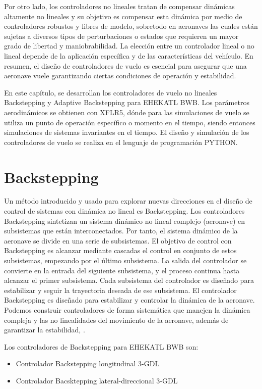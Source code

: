 Por otro lado, los controladores no lineales tratan de compensar dinámicas altamente no lineales y su objetivo es compensar esta dinámica por medio de controladores robustos y libres de modelo, sobretodo en aeronaves las cuales están sujetas a diversos tipos de perturbaciones o estados que requieren un mayor grado de libertad y maniobrabilidad. 
La elección entre un controlador lineal o no lineal depende de la aplicación específica y de las características del vehículo.
En resumen, el diseño de controladores de vuelo es esencial para asegurar que una aeronave vuele garantizando ciertas condiciones de operación y estabilidad.  

En este capítulo, se desarrollan los controladores de vuelo no lineales Backstepping y Adaptive Backstepping para EHEKATL BWB. Los parámetros aerodinámicos se obtienen con XFLR5, dónde para las simulaciones de vuelo se utiliza un punto de operación específico o momento en el tiempo, siendo entonces simulaciones de sistemas invariantes en el tiempo.   
El diseño y simulación de los controladores de vuelo se realiza en el lenguaje de programación PYTHON.


 \section{Backstepping}

Un método introducido y usado para explorar nuevas direcciones en el diseño de control de sistemas con dinámica no lineal es Backstepping. 
%
Los controladores Backstepping sintetizan un sistema dinámico no lineal complejo (aeronave) en subsistemas que están interconectados.
Por tanto,  el sistema dinámico de la aeronave se divide en una serie de subsistemas.
%
El objetivo de control con Backstepping es alcanzar mediante cascadas el control en conjunto de estos subsistemas, empezando por el último subsistema.
La salida del controlador se convierte en la entrada del siguiente subsistema, y el proceso continua hasta alcanzar el primer subsistema. 
%
Cada subsistema del controlador es diseñado para estabilizar y seguir la trayectoria deseada de ese subsistema. 
%
El controlador Backstepping es diseñado para estabilizar y controlar la dinámica de la aeronave. Podemos construir controladores de forma sistemática que manejen la dinámica compleja y las no linealidades del movimiento de la aeronave, además de garantizar la estabilidad, \cite{vanGils2015}. 

Los controladores de Backstepping para EHEKATL BWB son:
\begin{itemize}
    \item Controlador Backstepping longitudinal 3-GDL 
    \item Controlador Bacsktepping lateral-direccional 3-GDL
\end{itemize}

